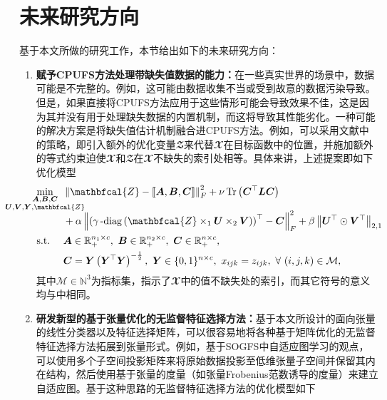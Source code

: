 \section{未来研究方向}
基于本文所做的研究工作，本节给出如下的未来研究方向：
\begin{enumerate}
    \item \textbf{赋予CPUFS方法处理带缺失值数据的能力：}在一些真实世界的场景中，数据可能是不完整的。例如，这可能由数据收集不当或受到故意的数据污染导致。但是，如果直接将CPUFS方法应用于这些情形可能会导致效果不佳，这是因为其并没有用于处理缺失数据的内置机制，而这将导致其性能劣化。一种可能的解决方案是将缺失值估计机制融合进CPUFS方法。例如，可以采用文献中的策略，即引入额外的优化变量$\mathbfcal{Z}$来代替$\mathbfcal{X}$在目标函数中的位置，并施加额外的等式约束迫使$\mathbfcal{X}$和$\mathbfcal{Z}$在$\mathbfcal{X}$不缺失的索引处相等。具体来讲，上述提案即如下优化模型
\begin{equation*}\vspace{-0.5em}
    \begin{aligned}
    & \underset{\smash[b]{\substack{\mathclap{\boldsymbol{A},\boldsymbol{B},\boldsymbol{C}}\\\mathclap{\boldsymbol{U},\boldsymbol{V},\boldsymbol{Y},\mathbfcal{Z}}}}}{\min}
    & &  \norm{\mathbfcal{Z}-\left\llbracket \boldsymbol{A}, \boldsymbol{B}, \boldsymbol{C} \right\rrbracket}_{F}^{2} + \nu\operatorname{Tr}\left(\boldsymbol{C}^{\top}\boldsymbol{L}\boldsymbol{C}\right) \\ \span&& + \alpha\norm{\left(\mydiag\left(\mathbfcal{Z}\times_{1}\boldsymbol{U}\times_{2}\boldsymbol{V}\right)\right)^{\top} - \boldsymbol{C}}_{F}^{2} + \beta \norm{\boldsymbol{U}^{\top}\odot\boldsymbol{V}^{\top}}_{2,1}\\
    & \text{s.t.}
    & & \boldsymbol{A}\in \mathbb{R}_{+}^{n_1 \times c},~\boldsymbol{B}\in \mathbb{R}_{+}^{n_2 \times c},~\boldsymbol{C}\in \mathbb{R}_{+}^{n \times c},\\
    \span &&\boldsymbol{C}=\boldsymbol{Y}\left(\boldsymbol{Y}^{\top} \boldsymbol{Y}\right)^{-\frac{1}{2}},~\boldsymbol{Y}\in\{0,1\}^{n\times c},~ x_{i j k}=z_{i j k},~\forall~ (i,j,k)\in\mathcal{M},
    \end{aligned}
\end{equation*}
其中$\mathcal{M}\in\mathbb{N}^{3}$为指标集，指示了$\mathbfcal{X}$中的值不缺失处的索引，而其它符号的意义均与中相同。
    \item \textbf{研发新型的基于张量优化的无监督特征选择方法：}基于本文所设计的面向张量的线性分类器以及特征选择矩阵，可以很容易地将各种基于矩阵优化的无监督特征选择方法拓展到张量形式。例如，基于SOGFS中自适应图学习的观点，可以使用多个子空间投影矩阵来将原始数据投影至低维张量子空间并保留其内在结构，然后使用基于张量的度量（如张量Frobenius范数诱导的度量）来建立自适应图。基于这种思路的无监督特征选择方法的优化模型如下

\end{enumerate}
